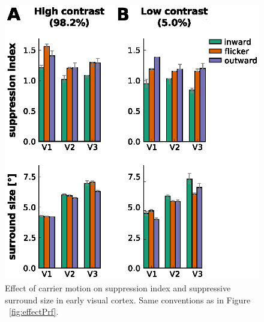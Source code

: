 \begin{figure}[htbp!]
\centering
\includegraphics[width=\textwidth]{figures/chapter_04/fig2c.eps}
\caption{Effect of carrier motion on suppression index and suppressive surround size in early visual cortex. Same conventions as in Figure ~\ref{fig:effectPrf}.}
\label{fig:effectPrf_si} 
\end{figure}

